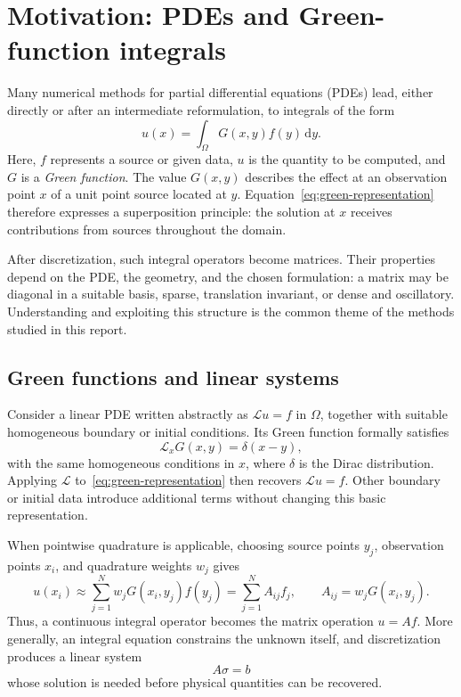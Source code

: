 \section{Motivation: PDEs and Green-function integrals}
\label{sec:motivation}

Many numerical methods for partial differential equations (PDEs) lead, either directly or after an intermediate reformulation, to integrals of the form
\begin{equation}
    u(x) = \int_\Omega G(x,y) f(y)\,\mathrm{d}y.
    \label{eq:green-representation}
\end{equation}
Here, $f$ represents a source or given data, $u$ is the quantity to be computed, and $G$ is a \emph{Green function}. The value $G(x,y)$ describes the effect at an observation point $x$ of a unit point source located at $y$. Equation~\eqref{eq:green-representation} therefore expresses a superposition principle: the solution at $x$ receives contributions from sources throughout the domain.

After discretization, such integral operators become matrices. Their properties depend on the PDE, the geometry, and the chosen formulation: a matrix may be diagonal in a suitable basis, sparse, translation invariant, or dense and oscillatory. Understanding and exploiting this structure is the common theme of the methods studied in this report.

\subsection{Green functions and linear systems}

Consider a linear PDE written abstractly as $\mathcal{L}u=f$ in $\Omega$, together with suitable homogeneous boundary or initial conditions. Its Green function formally satisfies
\begin{equation}
    \mathcal{L}_xG(x,y)=\delta(x-y),
\end{equation}
with the same homogeneous conditions in $x$, where $\delta$ is the Dirac distribution. Applying $\mathcal{L}$ to~\eqref{eq:green-representation} then recovers $\mathcal{L}u=f$. Other boundary or initial data introduce additional terms without changing this basic representation.

When pointwise quadrature is applicable, choosing source points $y_j$, observation points $x_i$, and quadrature weights $w_j$ gives
\begin{equation}
    u(x_i)\approx\sum_{j=1}^{N}w_jG(x_i,y_j)f(y_j)
    =\sum_{j=1}^{N}A_{ij}f_j,
    \qquad A_{ij}=w_jG(x_i,y_j).
    \label{eq:discrete-green}
\end{equation}
Thus, a continuous integral operator becomes the matrix operation $u=Af$. More generally, an integral equation constrains the unknown itself, and discretization produces a linear system
\begin{equation}
    A\sigma=b
    \label{eq:generic-system}
\end{equation}
whose solution is needed before physical quantities can be recovered.

